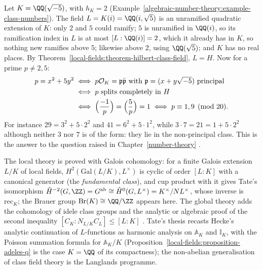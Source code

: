 \begin{example}\label{local-fields:example-x2-5y2}
Let $K = \QQ(\sqrt{-5})$, with $h_K = 2$ (Example~\ref{algebraic-number-theory:example-class-numbers}). The field $L = K(i) = \QQ(i, \sqrt5)$ is an unramified quadratic extension of $K$: only $2$ and $5$
could ramify; $5$ is unramified in $\QQ(i)$, so its ramification index in $L$ is at most $[L : \QQ(i)] = 2$, which it already has in $K$, so nothing new ramifies above $5$; likewise above $2$, using $\QQ(\sqrt5)$;
and $K$ has no real places. By Theorem~\ref{local-fields:theorem-hilbert-class-field}, $L = H$. Now for a prime $p \neq 2, 5$:
\[
\begin{aligned}
p = x^2 + 5y^2 &\iff p\mathcal{O}_K = \mathfrak{p}\bar{\mathfrak{p}} \text{ with } \mathfrak{p} = (x + y\sqrt{-5}) \text{ principal}\\
&\iff p \text{ splits completely in } H\\
&\iff \Bigl(\frac{-1}{p}\Bigr) = \Bigl(\frac{5}{p}\Bigr) = 1 \iff p \equiv 1, 9 \pmod{20}.
\end{aligned}
\]
For instance $29 = 3^2 + 5 \cdot 2^2$ and $41 = 6^2 + 5 \cdot 1^2$, while $3 \cdot 7 = 21 = 1 + 5 \cdot 2^2$ although neither $3$ nor $7$ is of the form: they lie in the non-principal class. This is the
answer to the question raised in Chapter~\ref{number-theory} \cite{cox-primes}.
\end{example}

\begin{remark}\label{local-fields:remark-cft-proofs}
The local theory is proved with Galois cohomology: for a finite Galois extension $L/K$ of local fields, $H^2(\mathrm{Gal}(L/K), L^\times)$ is cyclic of order $[L : K]$ with a canonical generator (the
\emph{fundamental class}), and cup product with it gives Tate's isomorphism $\hat H^{-2}(G, \ZZ) = G^{\mathrm{ab}} \cong \hat H^0(G, L^\times) = K^\times/NL^\times$, whose inverse is $\mathrm{rec}_K$; the Brauer
group $\mathrm{Br}(K) \cong \QQ/\ZZ$ appears here. The global theory adds the cohomology of idele class groups and the analytic or algebraic proof of the second inequality
$[C_K : N_{L/K}C_L] \leq [L : K]$ \cite{cassels-frohlich}. Tate's thesis recasts Hecke's analytic continuation of $L$-functions as harmonic analysis on $\mathbb{A}_K$ and $\mathbb{I}_K$, with the Poisson
summation formula for $\mathbb{A}_K/K$ (Proposition~\ref{local-fields:proposition-adeles-q} is the case $K = \QQ$ of its compactness); the non-abelian generalisation of class field theory is the Langlands
programme.
\end{remark}

